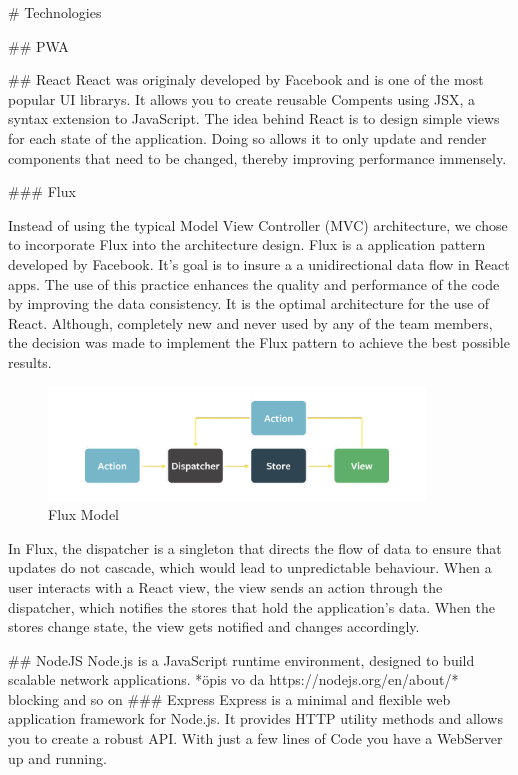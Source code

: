 \begin{markdown}
# Technologies



## PWA

## React
React\cite{React} was originaly developed by Facebook and is one of the most popular UI librarys. It allows you to create reusable Compents using JSX, a syntax extension to JavaScript.
The idea behind React is to design simple views for each state of the application. Doing so allows it to only update and render components that need to be changed, thereby improving performance immensely.


### Flux

Instead of using the typical Model View Controller (MVC) architecture, we chose to incorporate Flux\cite{OurReadme} into the architecture design. Flux is a application pattern developed by Facebook. It's goal is to insure a a unidirectional data flow in React apps. The use of this practice enhances the quality and performance of the code by improving the data consistency. It is the optimal architecture for the use of React. Although, completely new and never used by any of the team members, the decision was made to implement the Flux pattern to achieve the best possible results.

\begin{figure}[H]
  \includegraphics[width=10cm, center]{./assets/flux.png}
  \caption{Flux Model{\cite{FluxModel}}}
\end{figure}




In Flux, the dispatcher is a singleton that directs the flow of data to ensure that updates do not cascade, which would lead to unpredictable behaviour. When a user interacts with a React view, the view sends an action through the dispatcher, which notifies the stores that hold the application’s data. When the stores change state, the view gets notified and changes accordingly.

## NodeJS
Node.js is a JavaScript runtime environment, designed to build scalable network applications\cite{Node}.
*öpis vo da https://nodejs.org/en/about/* blocking and so on
### Express
Express\cite{Express} is a minimal and flexible web application framework for Node.js. It provides HTTP utility methods and allows you to create a robust API.
With just a few lines of Code you have a WebServer up and running.




\end{markdown}
